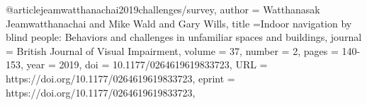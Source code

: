 @article{jeamwatthanachai2019challenges/survey,
author = {Watthanasak Jeamwatthanachai and Mike Wald and Gary Wills},
title ={Indoor navigation by blind people: Behaviors and challenges in unfamiliar spaces and buildings},
journal = {British Journal of Visual Impairment},
volume = {37},
number = {2},
pages = {140-153},
year = {2019},
doi = {10.1177/0264619619833723},
URL = {https://doi.org/10.1177/0264619619833723},
eprint = {https://doi.org/10.1177/0264619619833723},
}